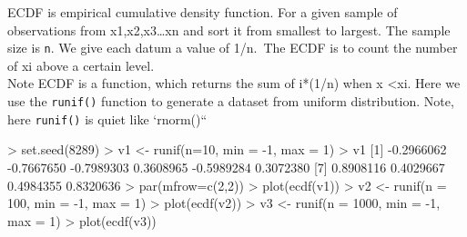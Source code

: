 \documentclass[
]{article}
\newenvironment{Shaded}{\begin{snugshade}}{\end{snugshade}}
\newcommand{\AttributeTok}[1]{\textcolor[rgb]{0.77,0.63,0.00}{#1}}
\newcommand{\DecValTok}[1]{\textcolor[rgb]{0.00,0.00,0.81}{#1}}
\newcommand{\FloatTok}[1]{\textcolor[rgb]{0.00,0.00,0.81}{#1}}
\newcommand{\FunctionTok}[1]{\textcolor[rgb]{0.00,0.00,0.00}{#1}}
\newcommand{\NormalTok}[1]{#1}
\newcommand{\OtherTok}[1]{\textcolor[rgb]{0.56,0.35,0.01}{#1}}
\newcommand{\SpecialCharTok}[1]{\textcolor[rgb]{0.00,0.00,0.00}{#1}}
\begin{document}
ECDF is empirical cumulative density function. For a given sample of
observations from x1,x2,x3\ldots xn and sort it from smallest to
largest. The sample size is \texttt{n}. We give each datum a value of
1/n.~The ECDF is to count the number of xi above a certain level.\\
Note ECDF is a function, which returns the sum of i*(1/n) when x
\textless xi. Here we use the \texttt{runif()} function to generate a
dataset from uniform distribution. Note, here \texttt{runif()} is quiet
like `rnorm()``

\begin{Shaded}
\begin{Highlighting}[]
\SpecialCharTok{\textgreater{}} \FunctionTok{set.seed}\NormalTok{(}\DecValTok{8289}\NormalTok{)}
\SpecialCharTok{\textgreater{}}\NormalTok{ v1 }\OtherTok{\textless{}{-}} \FunctionTok{runif}\NormalTok{(}\AttributeTok{n=}\DecValTok{10}\NormalTok{, }\AttributeTok{min =} \SpecialCharTok{{-}}\DecValTok{1}\NormalTok{, }\AttributeTok{max =} \DecValTok{1}\NormalTok{)}
\SpecialCharTok{\textgreater{}}\NormalTok{ v1}
\NormalTok{ [}\DecValTok{1}\NormalTok{] }\SpecialCharTok{{-}}\FloatTok{0.2966062} \SpecialCharTok{{-}}\FloatTok{0.7667650} \SpecialCharTok{{-}}\FloatTok{0.7989303}  \FloatTok{0.3608965} \SpecialCharTok{{-}}\FloatTok{0.5989284}  \FloatTok{0.3072380}
\NormalTok{ [}\DecValTok{7}\NormalTok{]  }\FloatTok{0.8908116}  \FloatTok{0.4029667}  \FloatTok{0.4984355}  \FloatTok{0.8320636}
\SpecialCharTok{\textgreater{}} \FunctionTok{par}\NormalTok{(}\AttributeTok{mfrow=}\FunctionTok{c}\NormalTok{(}\DecValTok{2}\NormalTok{,}\DecValTok{2}\NormalTok{))}
\SpecialCharTok{\textgreater{}} \FunctionTok{plot}\NormalTok{(}\FunctionTok{ecdf}\NormalTok{(v1))}
\SpecialCharTok{\textgreater{}}\NormalTok{ v2 }\OtherTok{\textless{}{-}} \FunctionTok{runif}\NormalTok{(}\AttributeTok{n =} \DecValTok{100}\NormalTok{, }\AttributeTok{min =} \SpecialCharTok{{-}}\DecValTok{1}\NormalTok{, }\AttributeTok{max =} \DecValTok{1}\NormalTok{)}
\SpecialCharTok{\textgreater{}} \FunctionTok{plot}\NormalTok{(}\FunctionTok{ecdf}\NormalTok{(v2))}
\SpecialCharTok{\textgreater{}}\NormalTok{ v3 }\OtherTok{\textless{}{-}} \FunctionTok{runif}\NormalTok{(}\AttributeTok{n =} \DecValTok{1000}\NormalTok{, }\AttributeTok{min =} \SpecialCharTok{{-}}\DecValTok{1}\NormalTok{, }\AttributeTok{max =} \DecValTok{1}\NormalTok{)}
\SpecialCharTok{\textgreater{}} \FunctionTok{plot}\NormalTok{(}\FunctionTok{ecdf}\NormalTok{(v3))}
\end{Highlighting}
\end{Shaded}
\end{document}
